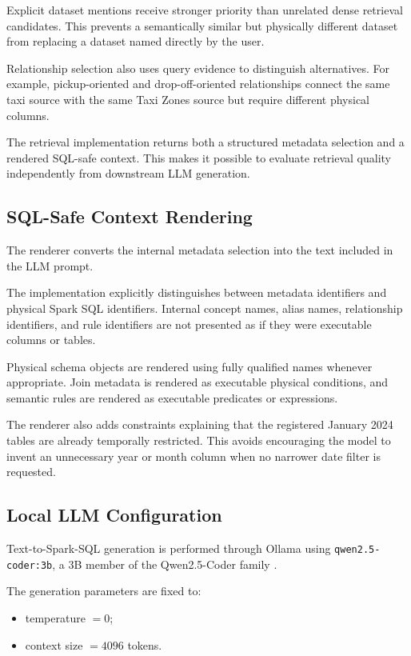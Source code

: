 Explicit dataset mentions receive stronger priority than unrelated dense
retrieval candidates. This prevents a semantically similar but physically
different dataset from replacing a dataset named directly by the user.

Relationship selection also uses query evidence to distinguish alternatives.
For example, pickup-oriented and drop-off-oriented relationships connect the
same taxi source with the same Taxi Zones source but require different
physical columns.

The retrieval implementation returns both a structured metadata selection and
a rendered SQL-safe context. This makes it possible to evaluate retrieval
quality independently from downstream LLM generation.


\subsection{SQL-Safe Context Rendering}

The renderer converts the internal metadata selection into the text included
in the LLM prompt.

The implementation explicitly distinguishes between metadata identifiers and
physical Spark SQL identifiers. Internal concept names, alias names,
relationship identifiers, and rule identifiers are not presented as if they
were executable columns or tables.

Physical schema objects are rendered using fully qualified names whenever
appropriate. Join metadata is rendered as executable physical conditions, and
semantic rules are rendered as executable predicates or expressions.

The renderer also adds constraints explaining that the registered January
2024 tables are already temporally restricted. This avoids encouraging the
model to invent an unnecessary year or month column when no narrower date
filter is requested.


\subsection{Local LLM Configuration}

Text-to-Spark-SQL generation is performed through Ollama using
\texttt{qwen2.5-coder:3b}, a 3B member of the Qwen2.5-Coder family \cite{hui2024qwen25coder}.

The generation parameters are fixed to:

\begin{itemize}

    \item temperature \(=0\);
    \item context size \(=4096\) tokens.

\end{itemize}

